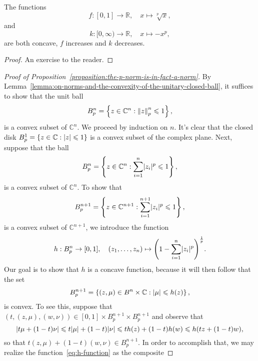 \begin{lemma}\label{lemma:two-concave-functions}
  The functions
  \begin{equation}\label{eq:f-function}
    f:[0,1]\to\mathbb{R},\quad{x\mapsto{\sqrt[p]{x}}},
  \end{equation}
  and
  \begin{equation}\label{eq:k-function}
    k:[0,\infty)\to\mathbb{R},\quad{x\mapsto{-x^{p}}},
  \end{equation}
  are both concave, \(f\) increases and \(k\) decreases.
\end{lemma}

\begin{proof}
  An exercise to the reader.
\end{proof}

\begin{proof}[Proof of Proposition~\ref{proposition:the-p-norm-is-in-fact-a-norm}]
  By Lemma~\ref{lemma:on-norms-and-the-convexity-of-the-unitary-closed-ball},
  it suffices to show that the unit ball
  \[
    B^{n}_{p}
    =
    \left\{z\in\mathbb{C}^{n}:\left\lVert{z}\right\rVert^{n}_{p}\leqslant{1}\right\},
  \]
  is a convex subset of \(\mathbb{C}^{n}\). We proceed by induction on
  \(n\). It's clear that the closed disk
  \(B^{1}_{p}=\left\{z\in\mathbb{C}:\lvert{z}\rvert\leqslant{1}\right\}\) is a
  convex subset of the complex plane. Next, suppose that the ball
  \[
    B^{n}_{p}
    =
    \left\{z\in\mathbb{C}^{n}:\sum_{i=1}^{n}\lvert{z_{i}}\rvert^{p}\leqslant{1}\right\},
  \]
  is a convex subset of \(\mathbb{C}^{n}\). To show that
  \[
    B^{n+1}_{p}
    =
    \left\{z\in\mathbb{C}^{n+1}:\sum_{i=1}^{n+1}\lvert{z_{i}}\rvert^{p}\leqslant{1}\right\},
  \]
  is a convex subset of \(\mathbb{C}^{n+1}\), we introduce the function
  \begin{equation}\label{eq:h-function}
    h:B^{n}_{p}\to{[0,1]},
    \quad{(z_{1},\ldots,z_{n})\mapsto\left(1-\sum_{i=1}^{n}\lvert{z_{i}}\rvert^{p}\right)^{\frac{1}{p}}}.
  \end{equation}
  Our goal is to show that \(h\) is a concave function, because it will then follow that
  the set
  \[
    B^{n+1}_{p}
    =
    \left\{(z,\mu)\in{B^{n}\times\mathbb{C}}:\lvert{\mu}\rvert\leqslant{h(z)}\right\},
  \]
  is convex. To see this, suppose that
  \((t,(z,\mu),(w,\nu))\in{[0,1]\times{B^{n+1}_{p}}\times{B^{n+1}_{p}}}\) and
  observe that
  \[
    \lvert{t\mu+(1-t)\nu}\rvert
    \leqslant{t\lvert{\mu}\rvert+(1-t)\lvert{\nu}\rvert}
    \leqslant{th(z)+(1-t)h(w)}
    \leqslant{h(tz+(1-t)w}),
  \]
  so that \(t(z,\mu)+(1-t)(w,\nu)\in{B^{n+1}_{p}}\). In order to accomplish
  that, we may realize the function~\eqref{eq:h-function} as the composite

\end{proof}
